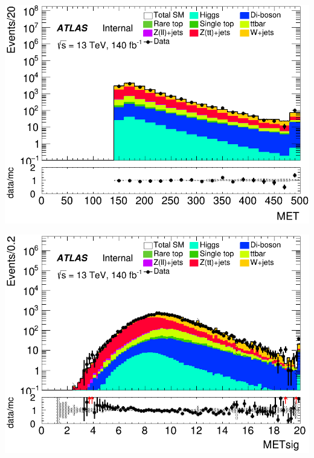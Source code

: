 \documentclass[usenames,dvipsnames]{beamer}
\begin{document}
\begin{frame}
    \vspace{0.5cm} %

    \begin{minipage}{0.32\textwidth}
        \centering
        \includegraphics[width=\textwidth]{graphics/HH_met/HH_met_MET.png}
    \end{minipage}
    \hfill
    \begin{minipage}{0.32\textwidth}
        \centering
        \includegraphics[width=\textwidth]{graphics/HH_met/HH_met_METsig.png}
    \end{minipage}
    \hfill
    
\end{frame}
\end{document}
